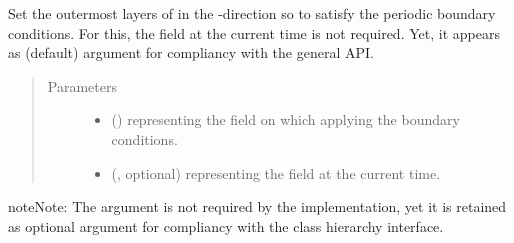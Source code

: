 \documentclass[letterpaper,10pt,english]{sphinxmanual}
\begin{document}
\begin{fulllineitems}
\begin{fulllineitems}
\end{fulllineitems}


\begin{fulllineitems}
\label{\detokenize{api:dycore.horizontal_boundary.Periodic.set_outermost_layers_y}}
Set the outermost layers of  in the -direction so to satisfy the periodic
boundary conditions. For this, the field  at the current time is not required. Yet,
it appears as (default) argument for compliancy with the general API.
\begin{quote}\begin{description}
\item[{Parameters}] \leavevmode\begin{itemize}
\item {} 
 () \textendash{}  representing the field on which applying the boundary conditions.

\item {} 
 (, optional) \textendash{}  representing the field at the current time.

\end{itemize}

\end{description}\end{quote}

\begin{sphinxadmonition}{note}{Note:}
The argument  is not required by the implementation, yet it is retained as optional
argument for compliancy with the class hierarchy interface.
\end{sphinxadmonition}

\end{fulllineitems}


\end{fulllineitems}

\end{document}
